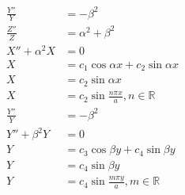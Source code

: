 \documentclass{article}
\begin{document}
\begin{align*}
  \frac{Y''}{Y}                                                                                             & = -\beta^2                                                                      \\
  \frac{Z''}{Z}                                                                                             & = \alpha^2 + \beta^2                                                            \\
  X'' + \alpha^2 X                                                                                          & = 0                                                                             \\
  X                                                                                                         & = c_1 \cos \alpha x + c_2 \sin \alpha x                                         \\
  X                                                                                                         & = c_2 \sin \alpha x                                                             \\
  X                                                                                                         & = c_2 \sin \frac{n \pi x}{a}, n \in \mathbb{R}                                  \\
  \frac{Y''}{Y}                                                                                             & = -\beta^2                                                                      \\
  Y'' + \beta^2 Y                                                                                           & = 0                                                                             \\
  Y                                                                                                         & = c_3 \cos \beta y + c_4 \sin \beta y                                           \\
  Y                                                                                                         & = c_4 \sin \beta y                                                              \\
  Y                                                                                                         & = c_4 \sin \frac{m \pi y}{a}, m \in \mathbb{R}                                  \\

\end{align*}
\end{document}
